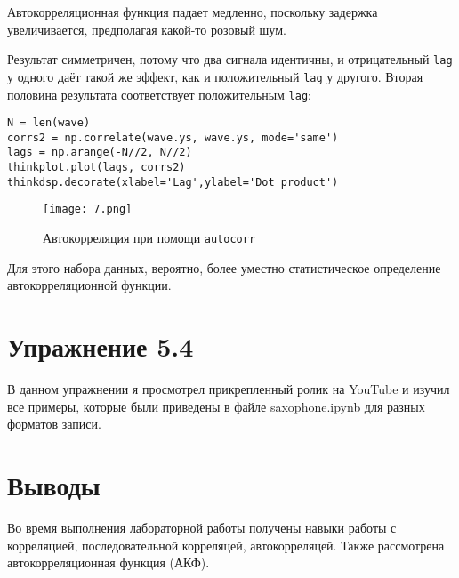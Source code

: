 \documentclass[a4paper,12pt]{report}
\begin{document}
Автокорреляционная функция падает медленно, поскольку задержка увеличивается, предполагая какой-то розовый шум.


Результат симметричен, потому что два сигнала идентичны, и отрицательный \texttt{lag} у одного даёт такой же эффект, как и положительный \texttt{lag} у другого. Вторая половина результата соответствует положительным \texttt{lag}:

\begin{lstlisting}[caption=Вторая половина результата]
N = len(wave)
corrs2 = np.correlate(wave.ys, wave.ys, mode='same')
lags = np.arange(-N//2, N//2)
thinkplot.plot(lags, corrs2)
thinkdsp.decorate(xlabel='Lag',ylabel='Dot product')
\end{lstlisting}

\begin{figure}[H]
        \centering
        \texttt{[image: 7.png]}
        \caption{Автокорреляция при помощи \texttt{autocorr}}
        \label{fig:lab5_fig3_4}
\end{figure}

Для этого набора данных, вероятно, более уместно статистическое определение автокорреляционной функции.

\chapter{Упражнение 5.4}

В данном упражнении я просмотрел прикрепленный ролик на YouTube и изучил все примеры, которые были приведены в файле saxophone.ipynb для разных форматов записи.

\chapter{Выводы}

Во время выполнения лабораторной работы получены навыки работы с корреляцией, последовательной корреляцей, автокорреляцей. Также рассмотрена автокорреляционная функция (АКФ).
\end{document}
